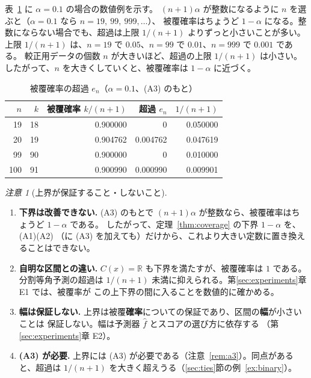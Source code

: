 \documentclass[a4paper,11pt]{jsarticle}
\theoremstyle{definition}
\theoremstyle{plain}
\theoremstyle{remark}
\newtheorem{remark}[definition]{注意}
\newcommand{\Real}{\mathbb{R}}
\newcommand{\fhat}{\hat{f}}
\begin{document}
表~\ref{tab:excess} に $\alpha=0.1$ の場合の数値例を示す。
$(n+1)\alpha$ が整数になるように $n$ を選ぶと（$\alpha=0.1$ なら $n=19,\ 99,\ 999,\dots$）、
被覆確率はちょうど $1-\alpha$ になる。整数にならない場合でも、超過は上限 $1/(n+1)$
よりずっと小さいことが多い。
上限 $1/(n+1)$ は、$n=19$ で $0.05$、$n=99$ で $0.01$、$n=999$ で $0.001$ である。
較正用データの個数 $n$ が大きいほど、超過の上限 $1/(n+1)$ は小さい。
したがって、$n$ を大きくしていくと、被覆確率は $1-\alpha$ に近づく。

\begin{table}[htbp]
  \centering
  \caption{被覆確率の超過 $e_n$（$\alpha=0.1$、(A3) のもと）}
  \label{tab:excess}
  \begin{tabular}{rrrrr}
    \toprule
    $n$ & $k$ & 被覆確率 $k/(n+1)$ & 超過 $e_n$ & $1/(n+1)$ \\
    \midrule
    19  & 18 & 0.900000 & 0        & 0.050000 \\
    20  & 19 & 0.904762 & 0.004762 & 0.047619 \\
    99  & 90 & 0.900000 & 0        & 0.010000 \\
    100 & 91 & 0.900990 & 0.000990 & 0.009901 \\
    \bottomrule
  \end{tabular}
\end{table}

\begin{remark}[上界が保証すること・しないこと]
  \label{rem:upper-meaning}
  \leavevmode  %
  \begin{enumerate}
    \item \textbf{下界は改善できない.}
      (A3) のもとで $(n+1)\alpha$ が整数なら、被覆確率はちょうど $1-\alpha$ である。
      したがって、定理~\ref{thm:coverage} の下界 $1-\alpha$ を、(A1)(A2)
      （に (A3) を加えても）だけから、これより大きい定数に置き換えることはできない。
    \item \textbf{自明な区間との違い.}
      $C(x)=\Real$ も下界を満たすが、被覆確率は $1$ である。分割等角予測の超過は
      $1/(n+1)$ 未満に抑えられる。第\ref{sec:experiments}章 E1 では、被覆率が
      この上下界の間に入ることを数値的に確かめる。
    \item \textbf{幅は保証しない.}
      上界は被覆\textbf{確率}についての保証であり、区間の\textbf{幅}が小さいことは
      保証しない。幅は予測器 $\fhat$ とスコアの選び方に依存する
      （第\ref{sec:experiments}章 E2）。
    \item \textbf{(A3) が必要.}
      上界には (A3) が必要である（注意~\ref{rem:a3}）。同点があると、超過は
      $1/(n+1)$ を大きく超えうる（\ref{sec:ties}節の例~\ref{ex:binary}）。
  \end{enumerate}
\end{remark}
\end{document}
